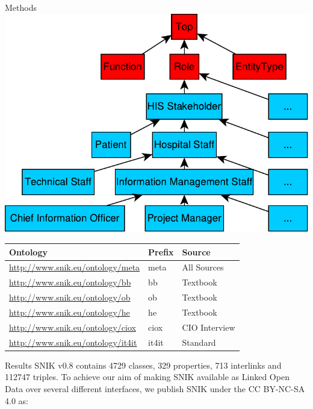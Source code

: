 \documentclass[portrait,final,a0paper,fontscale=0.320]{imiseposter}
\begin{document}
\begin{poster}
\begin{posterbox}[name=methods,below=background]{Methods}
{\centering\includegraphics[width=0.8\columnwidth]{img/hierarchy.pdf}}
\vspace{0.3em}
\begin{center}
\begin{tabular*}{0.96\columnwidth}{lll}
\toprule
\textbf{Ontology}				&\textbf{Prefix}&\textbf{Source}\\
\midrule
\url{http://www.snik.eu/ontology/meta}		&meta		&All Sources\\
\url{http://www.snik.eu/ontology/bb}		&bb		&Textbook~\cite{bb}\\
\url{http://www.snik.eu/ontology/ob}		&ob		&Textbook~\cite{ob}\\
\url{http://www.snik.eu/ontology/he}		&he		&Textbook~\cite{he}\\
\url{http://www.snik.eu/ontology/ciox}		&ciox		&CIO Interview\\
\url{http://www.snik.eu/ontology/it4it}		&it4it		&Standard~\cite{it4it}\\
\bottomrule
\end{tabular*}
\end{center}
\end{posterbox}
\begin{posterbox}[name=results,column=1]{Results}
SNIK v0.8 contains \num{4729} classes, \num{329} properties, \num{713} interlinks and \num{112747} triples.
To achieve our aim of making SNIK available as Linked Open Data over several different interfaces, we publish SNIK under the CC BY-NC-SA 4.0 as:

\end{posterbox}
\end{poster}
\end{document}
